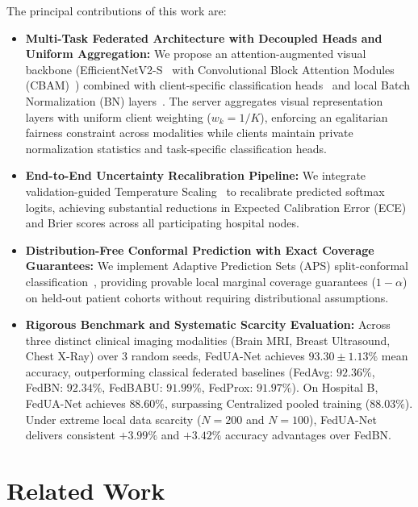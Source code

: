 \documentclass[journal]{IEEEtran}
\begin{document}
The principal contributions of this work are:
\begin{itemize}
    \item \textbf{Multi-Task Federated Architecture with Decoupled Heads and Uniform Aggregation:} We propose an attention-augmented visual backbone (EfficientNetV2-S~\cite{tan2021efficientnetv2} with Convolutional Block Attention Modules (CBAM)~\cite{woo2018cbam}) combined with client-specific classification heads~\cite{arivazhagan2019federated,collins2021fedrep} and local Batch Normalization (BN) layers~\cite{li2021fedbn}. The server aggregates visual representation layers with uniform client weighting ($w_k = 1/K$), enforcing an egalitarian fairness constraint across modalities while clients maintain private normalization statistics and task-specific classification heads.
    \item \textbf{End-to-End Uncertainty Recalibration Pipeline:} We integrate validation-guided Temperature Scaling~\cite{guo2017calibration} to recalibrate predicted softmax logits, achieving substantial reductions in Expected Calibration Error (ECE) and Brier scores across all participating hospital nodes.
    \item \textbf{Distribution-Free Conformal Prediction with Exact Coverage Guarantees:} We implement Adaptive Prediction Sets (APS) split-conformal classification~\cite{romano2020classification}, providing provable local marginal coverage guarantees ($1-\alpha$) on held-out patient cohorts without requiring distributional assumptions.
    \item \textbf{Rigorous Benchmark and Systematic Scarcity Evaluation:} Across three distinct clinical imaging modalities (Brain MRI, Breast Ultrasound, Chest X-Ray) over 3 random seeds, FedUA-Net achieves $93.30 \pm 1.13\%$ mean accuracy, outperforming classical federated baselines (FedAvg: $92.36\%$, FedBN: $92.34\%$, FedBABU: $91.99\%$, FedProx: $91.97\%$). On Hospital B, FedUA-Net achieves $88.60\%$, surpassing Centralized pooled training ($88.03\%$). Under extreme local data scarcity ($N=200$ and $N=100$), FedUA-Net delivers consistent $+3.99\%$ and $+3.42\%$ accuracy advantages over FedBN.
\end{itemize}

\section{Related Work}
\end{document}
